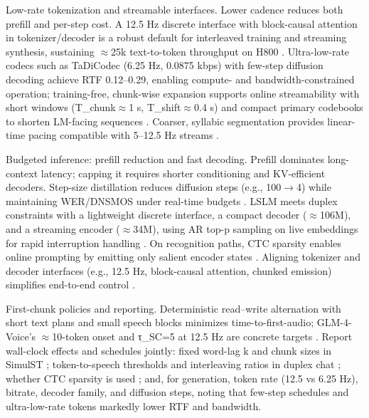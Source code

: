 \documentclass{article}
\begin{document}
Low-rate tokenization and streamable interfaces. Lower cadence reduces both prefill and per-step cost. A 12.5 Hz discrete interface with block-causal attention in tokenizer/decoder is a robust default for interleaved training and streaming synthesis, sustaining $\approx$25k text-to-token throughput on H800 \cite{zeng2024scalingspeechtextpretrainingsyntheticint}. Ultra-low-rate codecs such as TaDiCodec (6.25 Hz, 0.0875 kbps) with few-step diffusion decoding achieve RTF 0.12--0.29, enabling compute- and bandwidth-constrained operation; training-free, chunk-wise expansion supports online streamability with short windows (T_chunk$\approx$1 s, T_shift$\approx$0.4 s) and compact primary codebooks to shorten LM-facing sequences \cite{wang2025tadicodectextawarediffusionspeechtokeniz,kando2025exploringeffectsegmentationvocabularysiz}. Coarser, syllabic segmentation provides linear-time pacing compatible with 5--12.5 Hz streams \cite{cho2025sylbersyllabicembeddingrepresentationspe}.

Budgeted inference: prefill reduction and fast decoding. Prefill dominates long-context latency; capping it requires shorter conditioning and KV-efficient decoders. Step-size distillation reduces diffusion steps (e.g., 100$\rightarrow$4) while maintaining WER/DNSMOS under real-time budgets \cite{yang2025diffsoundstreamefficientspeechtokenizati}. LSLM meets duplex constraints with a lightweight discrete interface, a compact decoder ($\approx$106M), and a streaming encoder ($\approx$34M), using AR top-p sampling on live embeddings for rapid interruption handling \cite{ma2024languagemodelcanlistenwhilespeaking}. On recognition paths, CTC sparsity enables online prompting by emitting only salient encoder states \cite{tsunoo2024decoderonlyarchitecturespeechrecognition}. Aligning tokenizer and decoder interfaces (e.g., 12.5 Hz, block-causal attention, chunked emission) simplifies end-to-end control \cite{zeng2024scalingspeechtextpretrainingsyntheticint}.

First-chunk policies and reporting. Deterministic read--write alternation with short text plans and small speech blocks minimizes time-to-first-audio; GLM-4-Voice's $\approx$10-token onset and τ_SC=5 at 12.5 Hz are concrete targets \cite{zeng2024glm4voicetowardsintelligenthumanlikeends,cui2025thinkbeforeyoutalkenhancingmeaningfuldia}. Report wall-clock effects and schedules jointly: fixed word-lag k and chunk sizes in SimulST \cite{guo2025streamuniachievingstreamingspeechtransla}; token-to-speech thresholds and interleaving ratios in duplex chat \cite{zeng2024glm4voicetowardsintelligenthumanlikeends}; whether CTC sparsity is used \cite{tsunoo2024decoderonlyarchitecturespeechrecognition}; and, for generation, token rate (12.5 vs 6.25 Hz), bitrate, decoder family, and diffusion steps, noting that few-step schedules and ultra-low-rate tokens markedly lower RTF and bandwidth.
\end{document}
